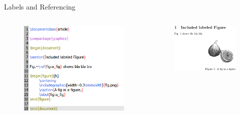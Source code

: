 \begin{frame}[fragile]{Labels and Referencing}
	\begin{columns}[t]
		\begin{column}{.5\textwidth}
			\begin{figure}
			\includegraphics[scale=.5]{Figures/code7}
			\end{figure}
		\end{column}
		\begin{column}{.5\textwidth}
			\begin{figure}
			\includegraphics[width=.8\linewidth, frame, trim={-1cm -1cm -1cm -1cm},clip]{Figures/doc9}
			\end{figure}
		\end{column}
	\end{columns}
\end{frame}

